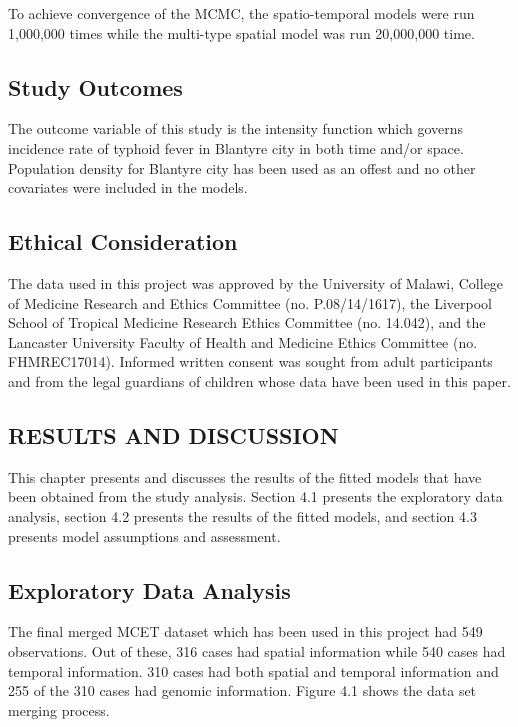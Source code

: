 \documentclass[a4paper]{thesis}
\begin{document}
To achieve convergence of the MCMC, the spatio-temporal models were run 1,000,000 times while the multi-type spatial model was run 20,000,000 time. 

\section{Study Outcomes}

The outcome variable of this study is the intensity function which governs incidence rate of typhoid fever in Blantyre city in both time and/or space. Population density for Blantyre city has been used as an offest and no other covariates were included in the models.

\section{Ethical Consideration}

The data used in this project was approved by the University of Malawi, College of
Medicine Research and Ethics Committee (no. P.08/14/1617),
the Liverpool School of Tropical Medicine Research Ethics
Committee (no. 14.042), and the Lancaster University Faculty of
Health and Medicine Ethics Committee (no. FHMREC17014). Informed written consent was sought
from adult participants and from the legal guardians of children whose data have been used in this paper.

\begin{center}
\chapter{RESULTS AND DISCUSSION}
\end{center} 

This chapter presents and discusses the results of the fitted models that have been obtained from the study analysis. Section 4.1 presents the exploratory data analysis, section 4.2 presents the results of the fitted models, and section 4.3 presents model assumptions and assessment.

\section{Exploratory Data Analysis}

The final merged MCET dataset which has been used in this project had 549 observations. Out of these, 316 cases had spatial information while 540 cases had temporal information. 310 cases had both spatial and temporal information and 255 of the 310 cases had genomic information. Figure 4.1 shows the data set merging process.\\
\end{document}
